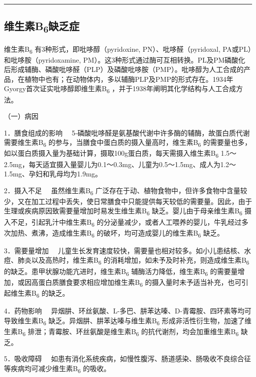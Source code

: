 \begin{center}\rule{0.5\linewidth}{\linethickness}\end{center}

\subsection{维生素B\textsubscript{6}缺乏症}

维生素B\textsubscript{6} 有3种形式，即吡哆醇（pyridoxine,
PN）、吡哆醛（pyridoxal, PA或PL）和吡哆胺（pyridoxamine,
PM）。这3种形式通过酶可互相转换。PL及PM磷酸化后形成辅酶、磷酸吡哆醛（PLP）及磷酸吡哆胺（PMP）。吡哆醇为人工合成的产品，在植物中也有；在动物体内，多以辅酶PLP及PMP的形式存在。1934年Gyorgy首次证实吡哆醇即维生素B\textsubscript{6}
，并于1938年阐明其化学结构与人工合成方法。

（一）病因

{1．膳食组成的影响}
　5-磷酸吡哆醛是氨基酸代谢中许多酶的辅酶，故蛋白质代谢需要维生素B\textsubscript{6}
的参与，当膳食中蛋白质的摄入量高时，维生素B\textsubscript{6}
的需要量也多，如以蛋白质摄入量为基础计算，摄取100g蛋白质，每天需摄入维生素B\textsubscript{6}
1.5～2.5mg，每天适宜摄入量婴儿为0.1～0.3mg、儿童为0.5～1.5mg、成人为1.2～1.5mg、孕妇和乳母均为1.9mg。

{2．摄入不足} 　虽然维生素B\textsubscript{6}
广泛存在于动、植物食物中，但许多食物中含量较少，又在加工过程中丢失，使日常膳食中只能提供每天较低的需要量。因此，由于生理或疾病原因致需要量增加时易发生维生素B\textsubscript{6}
缺乏。婴儿由于母亲维生素B\textsubscript{6}
摄入不足，引起乳汁中维生素B\textsubscript{6}
的分泌量减少，或者人工喂养的婴儿，牛乳经过多次加热、煮沸，造成维生素B\textsubscript{6}
的破坏，均可造成婴儿的维生素B\textsubscript{6} 缺乏。

{3．需要量增加}
　儿童生长发育速度较快，需要量也相对较多。如小儿患结核、水痘、肺炎以及高热时，维生素B\textsubscript{6}
的消耗增加，如未予及时补充，则造成维生素B\textsubscript{6}
的缺乏。患甲状腺功能亢进时，维生素B\textsubscript{6}
辅酶活力降低，维生素B\textsubscript{6}
的需要量增加，或因高蛋白质膳食要求相应增加维生素B\textsubscript{6}
的摄入量时未予适当补充，也可引起维生素B\textsubscript{6} 的缺乏。

{4．药物影响}
　异烟肼、环丝氨酸、L-多巴、肼苯达嗪、D-青霉胺、四环素等均可导致维生素B\textsubscript{6}
缺乏。异烟肼、肼苯达嗪与维生素B\textsubscript{6}
形成非活性衍生物，加速了维生素B\textsubscript{6}
排泄；青霉胺、环丝氨酸是维生素B\textsubscript{6}
的抗代谢剂，均会加重维生素B\textsubscript{6} 缺乏。

{5．吸收障碍}
　如患有消化系统疾病，如慢性腹泻、肠道感染、肠吸收不良综合征等疾病均可减少维生素B\textsubscript{6}
的吸收。

